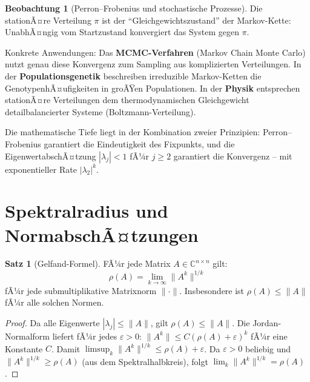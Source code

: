 ﻿\documentclass[a4paper,12pt]{report}
\theoremstyle{definition}
\newtheorem{satz}{Satz}
\newtheorem{beobachtung}{Beobachtung}
\begin{document}
\begin{beobachtung}[Perron--Frobenius und stochastische Prozesse]
    Die stationÃ¤re Verteilung $\pi$ ist der ``Gleich\-ge\-wichts\-zustand''
    der Markov-Kette: UnabhÃ¤ngig vom Startzustand konvergiert das System
    gegen $\pi$.

    Konkrete Anwendungen: Das \textbf{MCMC-Verfahren} (Markov Chain Monte Carlo)
    nutzt genau diese Konvergenz zum Sampling aus komplizierten Verteilungen.
    In der \textbf{Populationsgenetik} beschreiben irreduzible Markov-Ketten
    die GenotypenhÃ¤ufigkeiten in groÃŸen Populationen.
    In der \textbf{Physik} entsprechen stationÃ¤re Verteilungen dem
    thermodynamischen Gleichgewicht detailbalancierter Systeme (Boltzmann-Verteilung).

    Die mathematische Tiefe liegt in der Kombination zweier Prinzipien:
    Perron--Frobenius garantiert die Eindeutigkeit des Fixpunkts,
    und die EigenwertabschÃ¤tzung $|\lambda_j| < 1$ fÃ¼r $j \geq 2$
    garantiert die Konvergenz -- mit exponentieller Rate $|\lambda_2|^k$.
\end{beobachtung}


\section{Spektralradius und NormabschÃ¤tzungen}

\begin{satz}[Gelfand-Formel]
    FÃ¼r jede Matrix $A \in \mathbb{C}^{n \times n}$ gilt:
    \[
        \rho(A) = \lim_{k \to \infty} \|A^k\|^{1/k}
    \]
    fÃ¼r jede submultiplikative Matrixnorm $\|\cdot\|$. Insbesondere
    ist $\rho(A) \leq \|A\|$ fÃ¼r alle solchen Normen.
\end{satz}
\begin{proof}
    Da alle Eigenwerte $|\lambda_j| \leq \|A\|$, gilt $\rho(A) \leq \|A\|$.
    Die Jordan-Normalform liefert fÃ¼r jedes $\varepsilon > 0$:
    $\|A^k\| \leq C (\rho(A) + \varepsilon)^k$ fÃ¼r eine Konstante $C$.
    Damit $\limsup_k \|A^k\|^{1/k} \leq \rho(A) + \varepsilon$.
    Da $\varepsilon > 0$ beliebig und $\|A^k\|^{1/k} \geq \rho(A)$
    (aus dem Spektralhalbkreis), folgt $\lim_k \|A^k\|^{1/k} = \rho(A)$.
\end{proof}
\end{document}
